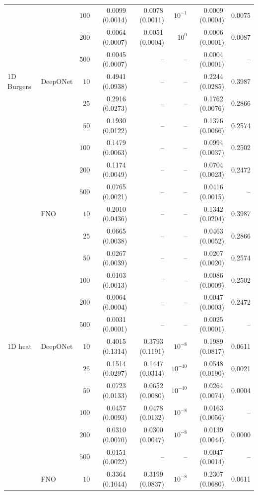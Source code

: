 \documentclass{article}
\begin{document}
{\begin{longtable}{llrrrrrr}
 &  & $100$ & 0.0099\,(0.0014) & 0.0078\,(0.0011) & $10^{-1}$ & 0.0009\,(0.0004) & 0.0075\\
 &  & $200$ & 0.0064\,(0.0007) & 0.0051\,(0.0004) & $10^{0}$ & 0.0006\,(0.0001) & 0.0087\\
 &  & $500$ & 0.0045\,(0.0007) & -- & -- & 0.0004\,(0.0001) & --\\
1D Burgers & DeepONet & $10$ & 0.4941\,(0.0938) & -- & -- & 0.2244\,(0.0285) & 0.3987\\
 &  & $25$ & 0.2916\,(0.0273) & -- & -- & 0.1762\,(0.0076) & 0.2866\\
 &  & $50$ & 0.1930\,(0.0122) & -- & -- & 0.1376\,(0.0066) & 0.2574\\
 &  & $100$ & 0.1479\,(0.0063) & -- & -- & 0.0994\,(0.0037) & 0.2502\\
 &  & $200$ & 0.1174\,(0.0049) & -- & -- & 0.0704\,(0.0023) & 0.2472\\
 &  & $500$ & 0.0765\,(0.0021) & -- & -- & 0.0416\,(0.0015) & --\\
 & FNO & $10$ & 0.2010\,(0.0436) & -- & -- & 0.1342\,(0.0204) & 0.3987\\
 &  & $25$ & 0.0665\,(0.0038) & -- & -- & 0.0463\,(0.0052) & 0.2866\\
 &  & $50$ & 0.0267\,(0.0039) & -- & -- & 0.0207\,(0.0020) & 0.2574\\
 &  & $100$ & 0.0103\,(0.0013) & -- & -- & 0.0086\,(0.0009) & 0.2502\\
 &  & $200$ & 0.0064\,(0.0004) & -- & -- & 0.0047\,(0.0003) & 0.2472\\
 &  & $500$ & 0.0031\,(0.0001) & -- & -- & 0.0025\,(0.0001) & --\\
1D heat & DeepONet & $10$ & 0.4015\,(0.1314) & 0.3793\,(0.1191) & $10^{-8}$ & 0.1989\,(0.0817) & 0.0611\\
 &  & $25$ & 0.1514\,(0.0297) & 0.1447\,(0.0314) & $10^{-10}$ & 0.0548\,(0.0190) & 0.0021\\
 &  & $50$ & 0.0723\,(0.0133) & 0.0652\,(0.0080) & $10^{-10}$ & 0.0264\,(0.0074) & 0.0004\\
 &  & $100$ & 0.0457\,(0.0093) & 0.0478\,(0.0132) & $10^{-8}$ & 0.0163\,(0.0056) & --\\
 &  & $200$ & 0.0310\,(0.0070) & 0.0300\,(0.0047) & $10^{-8}$ & 0.0139\,(0.0044) & 0.0000\\
 &  & $500$ & 0.0151\,(0.0022) & -- & -- & 0.0047\,(0.0014) & --\\
 & FNO & $10$ & 0.3364\,(0.1044) & 0.3199\,(0.0837) & $10^{-8}$ & 0.2307\,(0.0680) & 0.0611\\

\end{longtable}}
\end{document}
